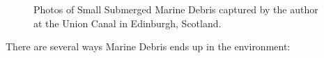 \begin{figure}[tb]
    \caption[Photos of Small Submerged Marine Debris at the Union Canal in Edinburgh, Scotland]{Photos of Small Submerged Marine Debris captured by the author at the Union Canal in Edinburgh, Scotland.}
    \label{md:edinburgh}
\end{figure}

There are several ways Marine Debris ends up in the environment:

